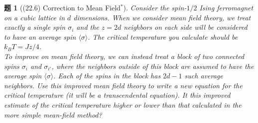 \documentclass[UTF8,10pt,a4paper]{article}
\theoremstyle{Problem}
\newtheorem{prob}{题}
\theoremstyle{Solution}
\begin{document}
\begin{prob}[(22.6) Correction to Mean Field$^*$]
    Consider the spin-$1/2$ Ising ferromagnet on a cubic lattice in $d$ dimensions. When we consider mean field theory, we treat exactly a single spin $\sigma_i$ and the $z=2d$ neighbors on each side will be considered to have an average spin $\langle\sigma\rangle$. The critical temperature you calculate should be $k_BT=Jz/4$.\\
    To improve on mean field theory, we can instead treat a block of two connected spins $\sigma_i$ and $\sigma_{i'}$, where the neighbors outside of this block are assumed to have the average spin $\langle\sigma\rangle$. Each of the spins in the block has $2d-1$ such average neighbors. Use this improved mean field theory to write a new equation for the critical temperature (it will be a transcendental equation). It this improved estimate of the critical temperature higher or lower than that calculated in the more simple mean-field method?
\end{prob}
\end{document}
